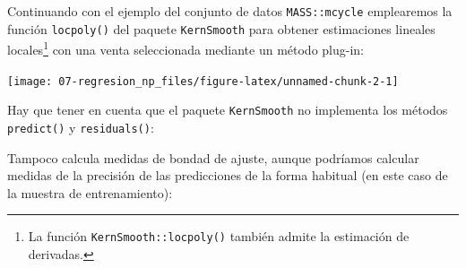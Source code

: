 \documentclass[
]{book}
\newenvironment{Shaded}{\begin{snugshade}}{\end{snugshade}}
\newcommand{\CommentTok}[1]{\textcolor[rgb]{0.56,0.35,0.01}{\textit{#1}}}
\newcommand{\DataTypeTok}[1]{\textcolor[rgb]{0.13,0.29,0.53}{#1}}
\newcommand{\KeywordTok}[1]{\textcolor[rgb]{0.13,0.29,0.53}{\textbf{#1}}}
\newcommand{\NormalTok}[1]{#1}
\newcommand{\OperatorTok}[1]{\textcolor[rgb]{0.81,0.36,0.00}{\textbf{#1}}}
\newcommand{\StringTok}[1]{\textcolor[rgb]{0.31,0.60,0.02}{#1}}
\theoremstyle{break}
\theoremstyle{definition}
\theoremstyle{definition}
\theoremstyle{definition}
\theoremstyle{remark}
\begin{document}
Continuando con el ejemplo del conjunto de datos \texttt{MASS::mcycle} emplearemos la función \texttt{locpoly()} del paquete \texttt{KernSmooth} para obtener estimaciones lineales locales\footnote{La función \texttt{KernSmooth::locpoly()} también admite la estimación de derivadas.} con una venta seleccionada mediante un método plug-in:

\begin{Shaded}
\end{Shaded}

\begin{center}\texttt{[image: 07-regresion\_np\_files/figure-latex/unnamed-chunk-2-1]} \end{center}

Hay que tener en cuenta que el paquete \texttt{KernSmooth} no implementa los métodos
\texttt{predict()} y \texttt{residuals()}:

\begin{Shaded}
\end{Shaded}

Tampoco calcula medidas de bondad de ajuste, aunque podríamos calcular medidas de la precisión de las predicciones de la forma habitual (en este caso de la muestra de entrenamiento):
\end{document}
